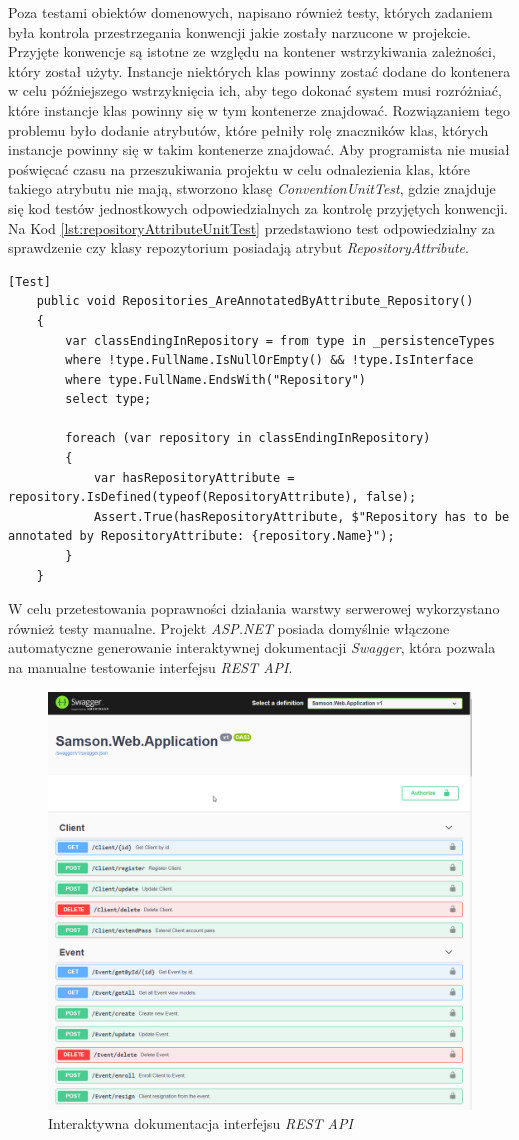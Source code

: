 \documentclass[a4paper,twoside,12pt]{book}
\begin{document}
Poza testami obiektów domenowych, napisano również testy, których zadaniem była kontrola przestrzegania konwencji jakie zostały narzucone w projekcie. Przyjęte konwencje są istotne ze względu na kontener wstrzykiwania zależności, który został użyty. Instancje niektórych klas powinny zostać dodane do kontenera w celu późniejszego wstrzyknięcia ich, aby tego dokonać system musi rozróżniać, które instancje klas powinny się w tym kontenerze znajdować. Rozwiązaniem tego problemu było dodanie atrybutów, które pełniły rolę znaczników klas, których instancje powinny się w takim kontenerze znajdować. Aby programista nie musiał poświęcać czasu na przeszukiwania projektu w celu odnalezienia klas, które takiego atrybutu nie mają, stworzono klasę \textit{ConventionUnitTest}, gdzie znajduje się kod testów jednostkowych odpowiedzialnych za kontrolę przyjętych konwencji. Na Kod \ref{lst:repositoryAttributeUnitTest} przedstawiono test odpowiedzialny za sprawdzenie czy klasy repozytorium posiadają atrybut \textit{RepositoryAttribute}.
\begin{lstlisting}[caption={Przykładowy test klasy \textit{ConventionUnitTest}}, label={lst:repositoryAttributeUnitTest}]
	[Test]
	public void Repositories_AreAnnotatedByAttribute_Repository()
	{
		var classEndingInRepository = from type in _persistenceTypes
		where !type.FullName.IsNullOrEmpty() && !type.IsInterface
		where type.FullName.EndsWith("Repository")
		select type;
		
		foreach (var repository in classEndingInRepository)
		{
			var hasRepositoryAttribute = repository.IsDefined(typeof(RepositoryAttribute), false);
			Assert.True(hasRepositoryAttribute, $"Repository has to be annotated by RepositoryAttribute: {repository.Name}");
		}
	}
\end{lstlisting}
W celu przetestowania poprawności działania warstwy serwerowej wykorzystano również testy manualne. Projekt \textit{ASP.NET} posiada domyślnie włączone automatyczne generowanie interaktywnej dokumentacji \textit{Swagger}, która pozwala na manualne testowanie interfejsu \textit{REST API}.
\begin{figure}[H]
	\centering
	\includegraphics[width=0.7\linewidth]{../zrzuty_ekranu/testy/swagger}
	\caption{Interaktywna dokumentacja interfejsu \textit{REST API}}
	\label{fig:swagger}
\end{figure}
\end{document}
